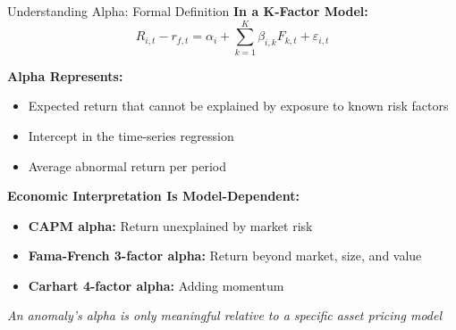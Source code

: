 \documentclass{beamer}
\begin{document}
\begin{frame}{Understanding Alpha: Formal Definition}
    \textbf{In a K-Factor Model:}
    \begin{equation*}
        R_{i,t} - r_{f,t} = \alpha_i + \sum_{k=1}^{K} \beta_{i,k} F_{k,t} + \varepsilon_{i,t}
    \end{equation*}
    
    \vspace{0.2cm}
    \textbf{Alpha Represents:}
    \begin{itemize}
        \item Expected return that cannot be explained by exposure to known risk factors
        \item Intercept in the time-series regression
        \item Average abnormal return per period
    \end{itemize}
    
    \vspace{0.3cm}
    \textbf{Economic Interpretation Is Model-Dependent:}
    \begin{itemize}
        \item \textbf{CAPM alpha:} Return unexplained by market risk
        \item \textbf{Fama-French 3-factor alpha:} Return beyond market, size, and value
        \item \textbf{Carhart 4-factor alpha:} Adding momentum
    \end{itemize}

    \textit{An anomaly's alpha is only meaningful relative to a specific asset pricing model}
\end{frame}
\end{document}
